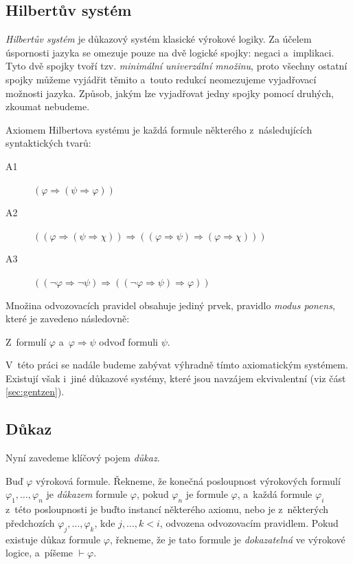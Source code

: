 \documentclass[thesis=B,czech,hidelinks]{thesis}[2012/06/26]
\begin{document}
\subsection{Hilbertův systém}
\label{sec:hilbert}

\emph{Hilbertův systém} je důkazový systém klasické výrokové logiky. Za účelem úspornosti jazyka se omezuje pouze na dvě logické spojky: negaci a~implikaci. Tyto dvě spojky tvoří tzv. \emph{minimální univerzální množinu}, proto všechny ostatní spojky můžeme vyjádřit těmito a~touto redukcí neomezujeme vyjadřovací možnosti jazyka. Způsob, jakým lze vyjadřovat jedny spojky pomocí druhých, zkoumat nebudeme.

Axiomem Hilbertova systému je každá formule některého z~následujících syntaktických tvarů:

\begin{description}
	\item[A1] $( \varphi \Rightarrow ( \psi \Rightarrow \varphi ))$
	\item[A2] $(( \varphi \Rightarrow ( \psi \Rightarrow \chi )) \Rightarrow (( \varphi \Rightarrow \psi ) \Rightarrow ( \varphi \Rightarrow \chi )))$
	\item[A3] $(( \neg \varphi \Rightarrow \neg \psi ) \Rightarrow (( \neg \varphi \Rightarrow \psi ) \Rightarrow \varphi ))$
\end{description}

Množina odvozovacích pravidel obsahuje jediný prvek, pravidlo \emph{modus ponens}, které je zavedeno následovně:

\begin{dfn}
Z~formulí $\varphi$ a~$\varphi \Rightarrow \psi$ odvoď formuli $\psi$.
\end{dfn}

V~této práci se nadále budeme zabývat výhradně tímto axiomatickým systémem. Existují však i~jiné důkazové systémy, které jsou navzájem ekvivalentní (viz část \ref{sec:gentzen}).

\subsection{Důkaz}

Nyní zavedeme klíčový pojem \emph{důkaz}.

\begin{dfn}
Buď $\varphi$ výroková formule. Řekneme, že konečná posloupnost výrokových formulí $\varphi_1 , \ldots, \varphi_n$ je \emph{důkazem} formule $\varphi$, pokud $\varphi_n$ je formule $\varphi$, a~každá formule $\varphi_i$ z~této posloupnosti je buďto instancí některého axiomu, nebo je z~některých předchozích $\varphi_j, \ldots , \varphi_k$, kde $j, \ldots , k < i$, odvozena odvozovacím pravidlem. Pokud existuje důkaz formule $\varphi$, řekneme, že je tato formule je \emph{dokazatelná} ve výrokové logice, a~píšeme $\vdash \varphi$.
\end{dfn}
\end{document}
